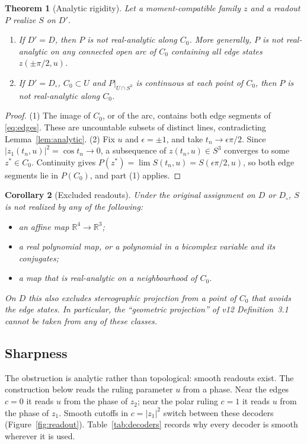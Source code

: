 \documentclass[11pt]{article}
\newtheorem{theorem}{Theorem}[section]
\newtheorem{corollary}[theorem]{Corollary}
\theoremstyle{definition}\newtheorem{definition}[theorem]{Definition}
\theoremstyle{remark}\newtheorem{remark}[theorem]{Remark}
\newcommand{\R}{\mathbb R}\newcommand{\C}{\mathbb C}\newcommand{\Z}{\mathbb Z}
\begin{document}
\begin{theorem}[Analytic rigidity]\label{thm:rigidity}
Let a moment-compatible family $z$ and a readout $P$ realize $S$ on $D'$.
\begin{enumerate}
\item If $D'=D$, then $P$ is not real-analytic along $C_0$. More generally, $P$
is not real-analytic on any connected open arc of $C_0$ containing all edge
states $z(\pm\pi/2,u)$.
\item If $D'=D_\circ$, $C_0\subset U$ and $P|_{U\cap S^3}$ is continuous at each
point of $C_0$, then $P$ is not real-analytic along $C_0$.
\end{enumerate}
\end{theorem}
\begin{proof}
(1) The image of $C_0$, or of the arc, contains both edge segments of
\eqref{eq:edges}. These are uncountable subsets of distinct lines,
contradicting Lemma~\ref{lem:analytic}.
(2) Fix $u$ and $\epsilon=\pm1$, and take $t_n\to\epsilon\pi/2$. Since
$|z_1(t_n,u)|^2=\cos t_n\to0$, a subsequence of $z(t_n,u)\in S^3$ converges to
some $z^*\in C_0$. Continuity gives $P(z^*)=\lim S(t_n,u)=S(\epsilon\pi/2,u)$,
so both edge segments lie in $P(C_0)$, and part (1) applies.
\end{proof}

\begin{corollary}[Excluded readouts]\label{cor:excluded}
Under the original assignment on $D$ or $D_\circ$, $S$ is not realized by any of
the following:
\begin{itemize}
\item an affine map $\R^4\to\R^3$;
\item a real polynomial map, or a polynomial in a bicomplex variable and its
conjugates;
\item a map that is real-analytic on a neighbourhood of $C_0$.
\end{itemize}
On $D$ this also excludes stereographic projection from a point of $C_0$ that
avoids the edge states. In particular, the ``geometric projection'' of v12
Definition~3.1 cannot be taken from any of these classes.
\end{corollary}

\subsection{Sharpness}
The obstruction is analytic rather than topological: smooth readouts exist.
The construction below reads the ruling parameter $u$ from a phase. Near the
edges $c=0$ it reads $u$ from the phase of $z_2$; near the polar ruling $c=1$
it reads $u$ from the phase of $z_1$. Smooth cutoffs in $c=|z_1|^2$ switch
between these decoders (Figure~\ref{fig:readout}). Table~\ref{tab:decoders}
records why every decoder is smooth wherever it is used.
\end{document}
